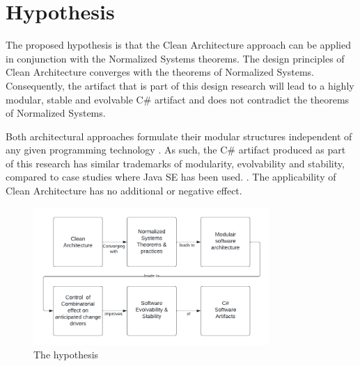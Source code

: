 \section{Hypothesis} \label{hypothesis} 

The proposed hypothesis is that the Clean Architecture approach can be applied in
conjunction with the Normalized Systems theorems. The design principles of Clean
Architecture converges with the theorems of Normalized Systems. Consequently, the artifact
that is part of this design research will lead to a highly modular, stable and evolvable
C\# artifact and does not contradict the theorems of Normalized Systems.

Both architectural approaches formulate their modular structures independent of any given
programming technology \parencite[]{mannaert_normalized_2009,martin_clean_2018}. As such,
the C\# artifact produced as part of this research has similar trademarks of modularity,
evolvability and stability, compared to case studies where Java SE has been used.
\parencites[]{oorts_building_2014, de_bruyn_enabling_2018}. The applicability of Clean
Architecture has no additional or negative effect.

\begin{figure}[H]
    \centering
    \includegraphics[width=0.8\textwidth]{Figures/hypothesis.pdf}
    \caption[The hypothesis]{The hypothesis}
    \label{fig_hypothesis}
\end{figure}